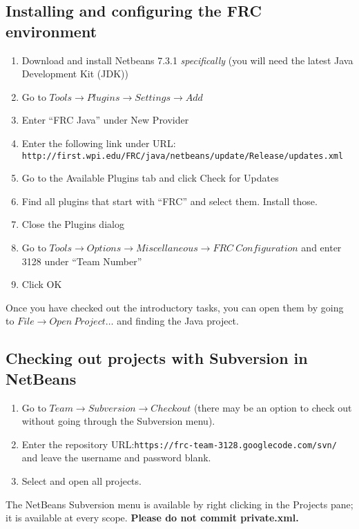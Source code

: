 \documentclass[a4paper]{article}
\begin{document}
\subsection{Installing and configuring the FRC environment}
\begin{enumerate}
\item{Download and install Netbeans 7.3.1 \textit{specifically} (you will need the latest Java Development Kit (JDK))}
\item{Go to $Tools \rightarrow Plugins \rightarrow Settings \rightarrow Add$}
\item{Enter ``FRC Java'' under New Provider}
\item{Enter the following link under URL: \lstinline{http://first.wpi.edu/FRC/java/netbeans/update/Release/updates.xml}}
\item{Go to the Available Plugins tab and click Check for Updates}
\item{Find all plugins that start with ``FRC'' and select them. Install those.}
\item{Close the Plugins dialog}
\item{Go to $Tools\rightarrow Options\rightarrow Miscellaneous\rightarrow FRC\ Configuration$ and enter 3128 under ``Team Number''}
\item{Click OK}
\end{enumerate}

Once you have checked out the introductory tasks, you can open them by going to $File\rightarrow Open\ Project\ldots$ and finding the Java project.

\subsection{Checking out projects with Subversion in NetBeans}
\begin{enumerate}
\item{Go to $Team\rightarrow Subversion\rightarrow Checkout$ (there may be an option to check out without going through the Subversion menu).}
\item{Enter the repository URL:\lstinline{https://frc-team-3128.googlecode.com/svn/} and leave the username and password blank.}
\item{Select and open all projects.}
\end{enumerate}

The NetBeans Subversion menu is available by right clicking in the Projects pane; it is available at every scope. \textbf{Please do not commit private.xml.}
\end{document}
